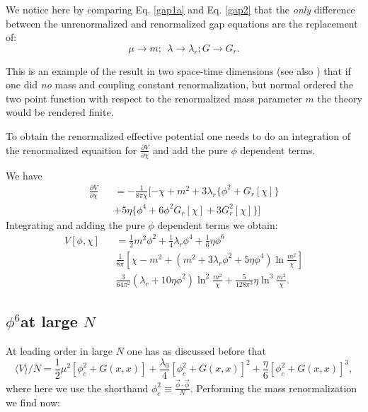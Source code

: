 \documentclass[a4paper,prd,preprint,superscriptaddress,showpacs,byrevtex]{revtex4}
\begin{document}
We notice here by comparing Eq. \ref{gap1a} and Eq. \ref{gap2} that the
{\em only} difference between the unrenormalized and renormalized gap
equations
are the replacement of:
\begin{equation}
\mu \rightarrow m; ~~ \lambda \rightarrow \lambda_r;  G \rightarrow G_r.
\end{equation}

This is an example of the result in two space-time dimensions (see also
\cite{ref:chang}) that if one did {\em no} mass and coupling constant
renormalization, but normal ordered the two point function with respect to the
renormalized mass parameter $m$ the theory would be rendered finite.

To obtain the renormalized effective potential one needs to do an
integration of the renormalized equaition for $\frac{\partial V}{\partial
\chi}$ and add  the pure $\phi$ dependent terms.

We have
\begin{eqnarray}
\frac {\partial V}{\partial \chi}&& = - \frac{1}{8 \pi \chi} [ -\chi + m^2 +
3 \lambda_r
\{ \phi^2 + G_r[\chi] \} \nonumber \\
&&+ 5 \eta \{ \phi^4 +6  \phi^2 G_r [\chi] + 3 G_r^2[\chi]\} ]  \label{gap3}
\end{eqnarray}
Integrating and adding the pure $\phi$ dependent terms we obtain:
 \begin{eqnarray}
V[\phi,\chi] && = \frac{1}{2} m^2 \phi^2 + \frac{1}{4} \lambda_r \phi^4
+\frac{1}{6} \eta \phi^6
\nonumber \\
&& \frac{1}{8 \pi} [ \chi - m^2 + (m^2+ 3 \lambda_r \phi^2+ 5 \eta \phi^4)
\ln \frac{m^2}{\chi} ]
\nonumber
\\
&&\frac{3}{64 \pi^2} (\lambda_r  + 10 \eta \phi^2) \ln^2 \frac{m^2}{\chi}
+\frac{5}{128 \pi^3} \eta
\ln^3
\frac{m^2}{\chi}.
\end{eqnarray}

\subsection{ $\phi^6 $at large $N$}
At leading order in large $N$ one has as discussed before that
\begin{equation}
\langle V \rangle /N = \frac{1}{2} \mu^2  [\phi_c^2+G(x,x)]
+\frac{\lambda_0}{4}  [\phi_c^2+G(x,x)]^2+
\frac{\eta}{6}
 [\phi_c^2+G(x,x)]^3,
\end{equation}
 where here we use the shorthand $ \phi_c^2 \equiv \frac {\vec \phi \cdot
\vec
\phi} {N}$.  Performing the mass renormalization we find now:
\end{document}
